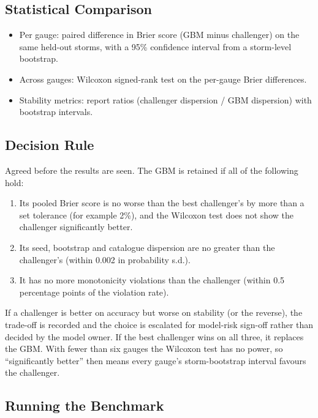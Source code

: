 \documentclass[11pt,a4paper]{article}
\begin{document}
\subsection{Statistical Comparison}

\begin{itemize}
  \item Per gauge: paired difference in Brier score (GBM minus
        challenger) on the same held-out storms, with a 95\%
        confidence interval from a storm-level bootstrap.
  \item Across gauges: Wilcoxon signed-rank test on the per-gauge
        Brier differences.
  \item Stability metrics: report ratios (challenger dispersion /
        GBM dispersion) with bootstrap intervals.
\end{itemize}

\subsection{Decision Rule}

Agreed before the results are seen.  The GBM is retained if all of
the following hold:
\begin{enumerate}
  \item Its pooled Brier score is no worse than the best challenger's
        by more than a set tolerance (for example 2\%), and the
        Wilcoxon test does not show the challenger significantly
        better.
  \item Its seed, bootstrap and catalogue dispersion are no greater
        than the challenger's (within 0.002 in probability s.d.).
  \item It has no more monotonicity violations than the challenger
        (within 0.5 percentage points of the violation rate).
\end{enumerate}

\noindent If a challenger is better on accuracy but worse on
stability (or the reverse), the trade-off is recorded and the choice
is escalated for model-risk sign-off rather than decided by the
model owner.  If the best challenger wins on all three, it replaces
the GBM.  With fewer than six gauges the Wilcoxon test has no power, so
``significantly better'' then means every gauge's storm-bootstrap
interval favours the challenger.

\subsection{Running the Benchmark}
\end{document}

